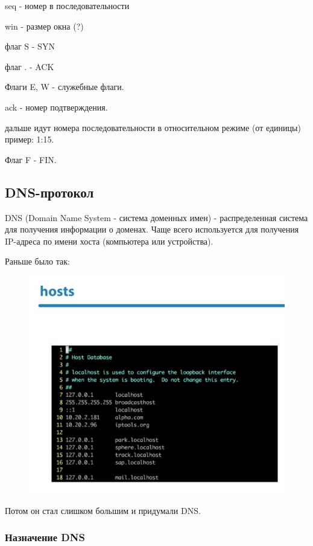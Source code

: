 \documentclass[a4paper,12pt]{article}
\begin{document}
	seq - номер в последовательности
	
	win - размер окна (?)
	
	флаг S - SYN
	
	флаг . - ACK
	
	Флаги E, W - служебные флаги.
	
	ack - номер подтверждения.
	
	дальше идут номера последовательности в относительном режиме (от единицы) пример: 1:15.
	
	Флаг F - FIN.
	
	\subsection{DNS-протокол}
	
	DNS (Domain Name System - система доменных имен) - распределенная система для получения информации о доменах. Чаще всего используется для получения IP-адреса по имени хоста (компьютера или устройства).
	
	Раньше было так:
	
	\begin{figure}[h!]
		\begin{center}
			{\includegraphics[scale = 1]{10.png}}
			\label{10}
		\end{center}
	\end{figure}

	Потом он стал слишком большим и придумали DNS.
	
	\subsubsection{Назначение DNS}
	
\end{document}
